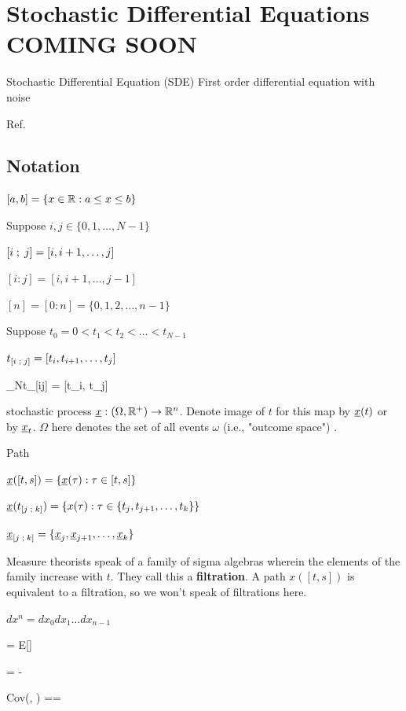\chapter{Stochastic Differential Equations COMING SOON}
\label{ch-stochastic-diff-eqns}


Stochastic Differential Equation (SDE)
First order differential equation with noise

Ref.\cite{sde-applied-book}

\section{Notation}

$[a, b]=\{ x\in { \mathbb{R}}: a\leq x \leq b\}$

Suppose $i, j\in \{0, 1, \ldots, N-1\}$

$[i \;;\; j] = [i, i+1, \ldots, j]$

$[i:j] = [i, i+1, \ldots, j-1]$


$[n]=[0:n]=\{0, 1, 2, \ldots, n-1\}$


Suppose $t_0=0<t_1<t_2<\ldots < t_{N-1}$



$t_{[i\;;\; j]} = [t_i, t_{i+1}, \ldots, t_j]$


\beq
\lim_{N\rarrow \infty}t_{[i\upto j]} =
[t_i, t_j]
\eeq

stochastic process ${\underline{x}}:(\Omega, { \mathbb{R}}^+) \rightarrow { \mathbb{R}}^n$.
Denote image of $t$ for this map by  ${\underline{x}}(t)$ or by ${\underline{x}}_t$. $\Omega$ 
here denotes the set of all events $\omega$ (i.e., "outcome space") .

Path

${\underline{x}}([t,s])=\{  {\underline{x}}(\tau): \tau\in[t,s]\}$


${\underline{x}}(t_{[j\;;\; k]}) =\{  x(\tau): \tau\in\{t_j, t_{j+1}, \ldots, t_k\}\}$

${\underline{x}}_{[j\;;\; k]} =\{ {\underline{x}}_j, {\underline{x}}_{j+1},
\ldots,{\underline{x}}_k\}$


Measure theorists speak of a family of sigma algebras wherein the elements of the family increase with $t$. They call this a {\bf filtration}. A path $x([t, s])$ is equivalent to a filtration,
so we won't speak of filtrations here.



$dx^n = dx_0 dx_1 \ldots dx_{n-1}$

\beq 
\av{\rva} = E[\rva]
\eeq

\beq
\Delta \rva = \rva - \av{\rva}
\eeq

\beq
Cov(\rva, \rvb) =\av{\rva, \rvb}=
\av{\Delta\rva \Delta\rvb}
\eeq


